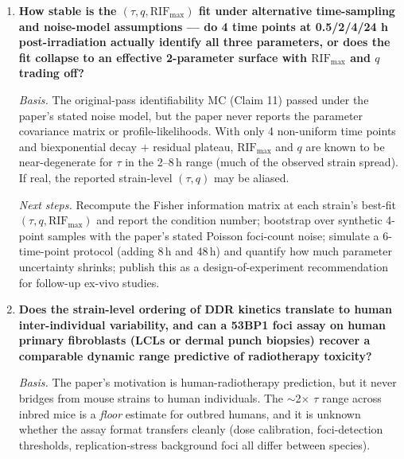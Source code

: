 \begin{enumerate}
\emph{Next steps.} Enlarge the CC cohort to $\sim$30 strains (feasible via the UNC
Collaborative Cross resource) to bring Fig.~7B to $n \geq 20$; reduce the organ
multiple-comparison burden by pre-registering 3--4 organs of highest biological
interest; run leave-one-strain-out cross-validation; attempt an orthogonal readout
($\gamma$H2AX foci or comet assay) on the same strains to test whether \emph{any}
DSB kinetic marker predicts in-vivo cancer, not just 53BP1.

\item \textbf{How stable is the $(\tau, q, \text{RIF}_{\max})$ fit under alternative
time-sampling and noise-model assumptions --- do 4 time points at 0.5/2/4/24 h
post-irradiation actually identify all three parameters, or does the fit collapse to
an effective 2-parameter surface with $\text{RIF}_{\max}$ and $q$ trading off?}

\emph{Basis.} The original-pass identifiability MC (Claim 11) passed under the paper's
stated noise model, but the paper never reports the parameter covariance matrix or
profile-likelihoods. With only 4 non-uniform time points and biexponential decay $+$
residual plateau, $\text{RIF}_{\max}$ and $q$ are known to be near-degenerate for
$\tau$ in the 2--8\,h range (much of the observed strain spread). If real, the reported
strain-level $(\tau, q)$ may be aliased.

\emph{Next steps.} Recompute the Fisher information matrix at each strain's best-fit
$(\tau, q, \text{RIF}_{\max})$ and report the condition number; bootstrap over synthetic
4-point samples with the paper's stated Poisson foci-count noise; simulate a 6-time-point
protocol (adding 8\,h and 48\,h) and quantify how much parameter uncertainty shrinks;
publish this as a design-of-experiment recommendation for follow-up ex-vivo studies.

\item \textbf{Does the strain-level ordering of DDR kinetics translate to human
inter-individual variability, and can a 53BP1 foci assay on human primary fibroblasts
(LCLs or dermal punch biopsies) recover a comparable dynamic range predictive of
radiotherapy toxicity?}

\emph{Basis.} The paper's motivation is human-radiotherapy prediction, but it never
bridges from mouse strains to human individuals. The $\sim$2$\times$ $\tau$ range
across inbred mice is a \emph{floor} estimate for outbred humans, and it is unknown
whether the assay format transfers cleanly (dose calibration, foci-detection
thresholds, replication-stress background foci all differ between species).


\end{enumerate}
